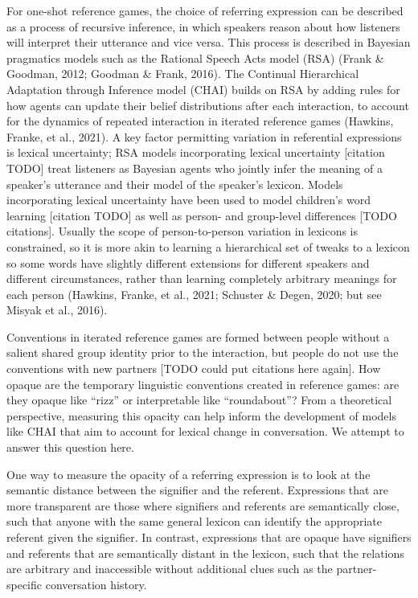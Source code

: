 \documentclass[10pt, letterpaper]{article}
\begin{document}
For one-shot reference games, the choice of referring expression can be
described as a process of recursive inference, in which speakers reason
about how listeners will interpret their utterance and vice versa. This
process is described in Bayesian pragmatics models such as the Rational
Speech Acts model (RSA) (Frank \& Goodman, 2012; Goodman \& Frank,
2016). The Continual Hierarchical Adaptation through Inference model
(CHAI) builds on RSA by adding rules for how agents can update their
belief distributions after each interaction, to account for the dynamics
of repeated interaction in iterated reference games (Hawkins, Franke, et
al., 2021). A key factor permitting variation in referential expressions
is lexical uncertainty; RSA models incorporating lexical uncertainty
{[}citation TODO{]} treat listeners as Bayesian agents who jointly infer
the meaning of a speaker's utterance and their model of the speaker's
lexicon. Models incorporating lexical uncertainty have been used to
model children's word learning {[}citation TODO{]} as well as person-
and group-level differences {[}TODO citations{]}. Usually the scope of
person-to-person variation in lexicons is constrained, so it is more
akin to learning a hierarchical set of tweaks to a lexicon so some words
have slightly different extensions for different speakers and different
circumstances, rather than learning completely arbitrary meanings for
each person (Hawkins, Franke, et al., 2021; Schuster \& Degen, 2020; but
see Misyak et al., 2016).

Conventions in iterated reference games are formed between people
without a salient shared group identity prior to the interaction, but
people do not use the conventions with new partners {[}TODO could put
citations here again{]}. How opaque are the temporary linguistic
conventions created in reference games: are they opaque like ``rizz'' or
interpretable like ``roundabout''? From a theoretical perspective,
measuring this opacity can help inform the development of models like
CHAI that aim to account for lexical change in conversation. We attempt
to answer this question here.

One way to measure the opacity of a referring expression is to look at
the semantic distance between the signifier and the referent.
Expressions that are more transparent are those where signifiers and
referents are semantically close, such that anyone with the same general
lexicon can identify the appropriate referent given the signifier. In
contrast, expressions that are opaque have signifiers and referents that
are semantically distant in the lexicon, such that the relations are
arbitrary and inaccessible without additional clues such as the
partner-specific conversation history.
\end{document}
